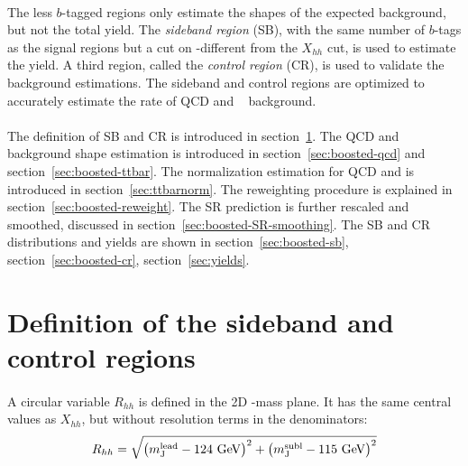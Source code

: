 \paragraph{}
The less $b$-tagged regions only estimate the shapes of the expected background, but not the total yield.
The \textit{sideband region} (SB), with the same number of $b$-tags as the signal regions but a cut on \mleadJ-\msublJ different from the $X_{hh}$ cut, is used to estimate the yield.
A third region, called the \textit{control region} (CR), is used to validate the background estimations.
The sideband and control regions are optimized to accurately estimate the rate of QCD and \ttbar~ background. 

\paragraph{}
The definition of SB and CR is introduced in section~\ref{sec:boosted-SBCR}.
The QCD and \ttbar~  background shape estimation is introduced in section~\ref{sec:boosted-qcd} and section~\ref{sec:boosted-ttbar}.
The normalization estimation for QCD and \ttbar is introduced in section~\ref{sec:ttbarnorm}.
The reweighting procedure is explained in section~\ref{sec:boosted-reweight}.
The SR prediction is further rescaled and smoothed, discussed in section~\ref{sec:boosted-SR-smoothing}.
The SB and CR distributions and yields are shown in section~\ref{sec:boosted-sb}, section~\ref{sec:boosted-cr}, section~\ref{sec:yields}.


\section{Definition of the sideband and control regions}
\label{sec:boosted-SBCR}

\paragraph{}
A circular variable $R_{hh}$ is defined in the 2D \mleadJ-\msublJ mass plane. 
It has the same central values as $X_{hh}$, but without resolution terms in the denominators:
\begin{equation}
\label{eq:boosted_RhhDef}
R_{hh} = \sqrt{\left(m^{\rm lead}_{\rm J} - \text{124 GeV}\right)^2 + \left(m^{\rm subl}_{\rm J} - \text{115 GeV}\right)^2}
\end{equation}

